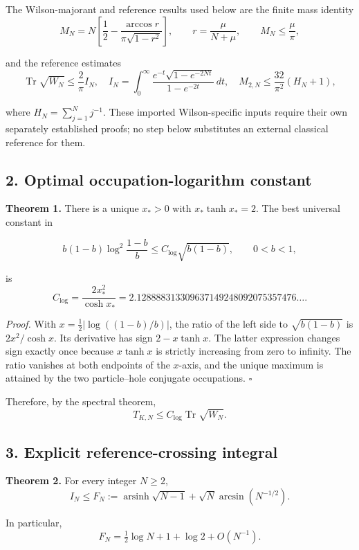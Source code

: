 \documentclass[
  10pt,
  a4paper,
]{article}
\begin{document}
The Wilson-majorant and reference results used below are the finite mass identity \[
M_N=N\left[\frac12-\frac{\arccos r}{\pi\sqrt{1-r^2}}\right],\qquad
r=\frac{\mu}{N+\mu},\qquad M_N\le\frac\mu\pi,
\]

and the reference estimates \[
\operatorname{Tr}\sqrt{W_N}\le\frac2\pi I_N,
\quad I_N=\int_0^\infty
\frac{e^{-t}\sqrt{1-e^{-2Nt}}}{1-e^{-2t}}\,dt,
\quad M_{2,N}\le\frac{32}{\pi^2}(H_N+1),
\]

where \(H_N=\sum_{j=1}^N j^{-1}\). These imported Wilson-specific inputs require their own separately established proofs; no step below substitutes an external classical reference for them.

\subsection{2. Optimal occupation-logarithm constant}\label{optimal-occupation-logarithm-constant}

\textbf{Theorem 1.} There is a unique \(x_*>0\) with \(x_*\tanh x_*=2\). The best universal constant in

\[
b(1-b)\log^2\!\frac{1-b}{b}\le C_{\log}\sqrt{b(1-b)},\qquad 0<b<1,
\]

is \[
\boxed{C_{\log}=\frac{2x_*^2}{\cosh x_*}
=2.128888313309637149248092075357476\ldots.}
\]

\emph{Proof.} With \(x=\tfrac12|\log((1-b)/b)|\), the ratio of the left side to \(\sqrt{b(1-b)}\) is \(2x^2/\cosh x\). Its derivative has sign \(2-x\tanh x\). The latter expression changes sign exactly once because \(x\tanh x\) is strictly increasing from zero to infinity. The ratio vanishes at both endpoints of the \(x\)-axis, and the unique maximum is attained by the two particle--hole conjugate occupations. \(\square\)

Therefore, by the spectral theorem, \[
\boxed{T_{K,N}\le C_{\log}\operatorname{Tr}\sqrt{W_N}.}\tag{1}
\]

\subsection{3. Explicit reference-crossing integral}\label{explicit-reference-crossing-integral}

\textbf{Theorem 2.} For every integer \(N\ge2\), \[
\boxed{I_N\le F_N:=
\operatorname{arsinh}\sqrt{N-1}+\sqrt N\arcsin(N^{-1/2}).}\tag{2}
\]

In particular, \[
F_N=\tfrac12\log N+1+\log2+O(N^{-1}).\tag{3}
\]
\end{document}
